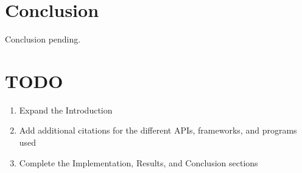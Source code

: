 \documentclass[11pt, final, conference, twocolumn]{IEEEtran}
\begin{document}
\section{Conclusion}
Conclusion pending.

\section{TODO}

\begin{enumerate}
\item Expand the Introduction
\item Add additional citations for the different APIs, frameworks, and programs used
\item Complete the Implementation, Results, and Conclusion sections
\end{enumerate}



\end{document}

